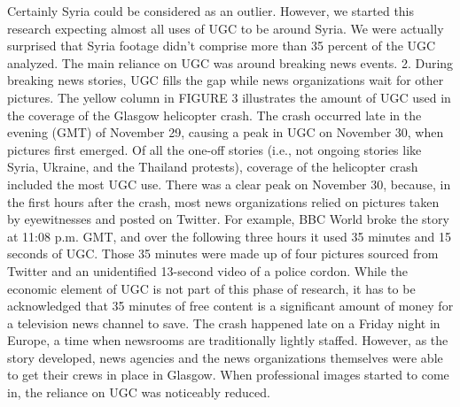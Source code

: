 \begin{enumerate}
Certainly Syria could be considered as an outlier. However, we started this
research expecting almost all uses of UGC to be around Syria. We were
actually surprised that Syria footage didn't comprise more than 35 percent
of the UGC analyzed. The main reliance on UGC was around breaking
news events.
2. During breaking news stories, UGC fills the gap while news
organizations wait for other pictures.
The yellow column in FIGURE 3 illustrates the amount of UGC used in
the coverage of the Glasgow helicopter crash. The crash occurred late in
the evening (GMT) of November 29, causing a peak in UGC on November
30, when pictures first emerged. Of all the one-off stories (i.e., not ongoing
stories like Syria, Ukraine, and the Thailand protests), coverage of the helicopter
crash included the most UGC use.
There was a clear peak on November 30, because, in the first hours after the
crash, most news organizations relied on pictures taken by eyewitnesses
and posted on Twitter. For example, BBC World broke the story at 11:08
p.m. GMT, and over the following three hours it used 35 minutes and 15
seconds of UGC. Those 35 minutes were made up of four pictures sourced
from Twitter and an unidentified 13-second video of a police cordon. While
the economic element of UGC is not part of this phase of research, it has to
be acknowledged that 35 minutes of free content is a significant amount of
money for a television news channel to save.
The crash happened late on a Friday night in Europe, a time when newsrooms
are traditionally lightly staffed. However, as the story developed,
news agencies and the news organizations themselves were able to get their
crews in place in Glasgow. When professional images started to come in,
the reliance on UGC was noticeably reduced.


\end{enumerate}
